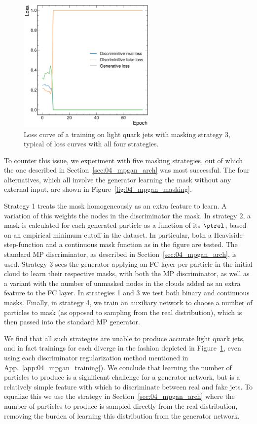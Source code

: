 \begin{figure}[htpb]
    \centering
    \centerline{\includegraphics[width=0.6\textwidth]{figures/04-ML4Sim/mpgan/masking/masking_loss.pdf}}
    \caption{Loss curve of a training on light quark jets with masking strategy 3, typical of loss curves with all four strategies.
    }
    \label{fig:04_mpgan_masking_loss}
\end{figure}

To counter this issue, we experiment with five masking strategies, out of which the one described in Section~\ref{sec:04_mpgan_arch} was most successful.
The four alternatives, which all involve the generator learning the mask without any external input, are shown in Figure~\ref{fig:04_mpgan_masking}.

Strategy 1 treats the mask homogeneously as an extra feature to learn.
A variation of this weights the nodes in the discriminator the mask.
In strategy 2, a mask is calculated for each generated particle as a function of its $\ptrel$, based on an empirical minimum cutoff in the dataset.
In particular, both a Heaviside-step-function and a continuous mask function as in the figure are tested.
The standard MP discriminator, as described in Section~\ref{sec:04_mpgan_arch}, is used.
Strategy 3 sees the generator applying an FC layer per particle in the initial cloud to learn their respective masks, with both the MP discriminator, as well as a variant with the number of unmasked nodes in the clouds added as an extra feature to the FC layer.
In strategies 1 and 3 we test
both binary and continuous masks.
Finally, in strategy 4, we train an auxiliary network to choose a number of particles to mask (as opposed to sampling from the real distribution), which is then passed into the standard MP generator.

We find that all such strategies are unable to produce accurate light quark jets, and in fact trainings for each diverge in the fashion depicted in Figure~\ref{fig:04_mpgan_masking_loss}, even using each discriminator regularization method mentioned in App.~\ref{app:04_mpgan_training}).
We conclude that learning the number of particles to produce is a significant challenge for a generator network, but is a relatively simple feature with which to discriminate between real and fake jets.
To equalize this we use the strategy in Section~\ref{sec:04_mpgan_arch} where the number of particles to produce is sampled directly from the real distribution, removing the burden of learning this distribution from the generator network.

